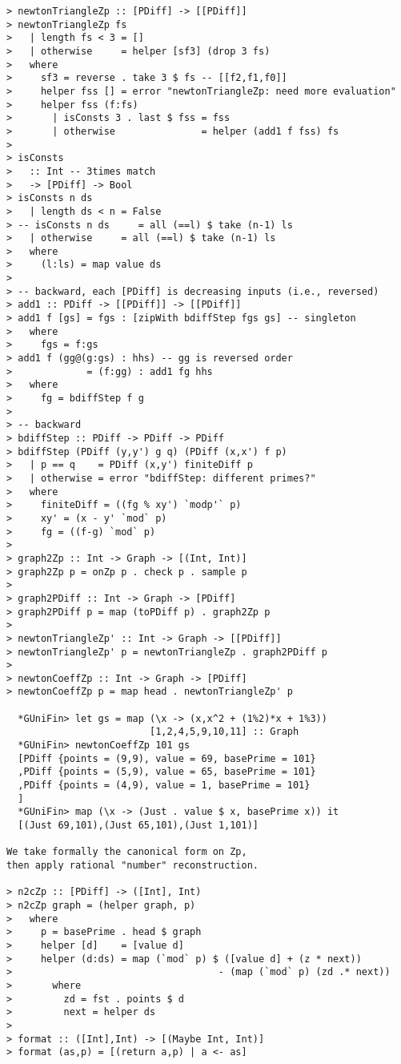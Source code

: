 \documentclass[11pt]{book}
\begin{document}
\begin{verbatim}
> newtonTriangleZp :: [PDiff] -> [[PDiff]]
> newtonTriangleZp fs
>   | length fs < 3 = []
>   | otherwise     = helper [sf3] (drop 3 fs)
>   where
>     sf3 = reverse . take 3 $ fs -- [[f2,f1,f0]]
>     helper fss [] = error "newtonTriangleZp: need more evaluation" 
>     helper fss (f:fs)
>       | isConsts 3 . last $ fss = fss
>       | otherwise               = helper (add1 f fss) fs
>
> isConsts 
>   :: Int -- 3times match
>   -> [PDiff] -> Bool
> isConsts n ds
>   | length ds < n = False    
> -- isConsts n ds     = all (==l) $ take (n-1) ls
>   | otherwise     = all (==l) $ take (n-1) ls
>   where 
>     (l:ls) = map value ds
>
> -- backward, each [PDiff] is decreasing inputs (i.e., reversed)
> add1 :: PDiff -> [[PDiff]] -> [[PDiff]]
> add1 f [gs] = fgs : [zipWith bdiffStep fgs gs] -- singleton
>   where 
>     fgs = f:gs
> add1 f (gg@(g:gs) : hhs) -- gg is reversed order
>             = (f:gg) : add1 fg hhs
>   where
>     fg = bdiffStep f g
>
> -- backward
> bdiffStep :: PDiff -> PDiff -> PDiff
> bdiffStep (PDiff (y,y') g q) (PDiff (x,x') f p)
>   | p == q    = PDiff (x,y') finiteDiff p
>   | otherwise = error "bdiffStep: different primes?"
>   where
>     finiteDiff = ((fg % xy') `modp'` p)
>     xy' = (x - y' `mod` p)
>     fg = ((f-g) `mod` p) 
>
> graph2Zp :: Int -> Graph -> [(Int, Int)]
> graph2Zp p = onZp p . check p . sample p 
>
> graph2PDiff :: Int -> Graph -> [PDiff]
> graph2PDiff p = map (toPDiff p) . graph2Zp p
>
> newtonTriangleZp' :: Int -> Graph -> [[PDiff]]
> newtonTriangleZp' p = newtonTriangleZp . graph2PDiff p
> 
> newtonCoeffZp :: Int -> Graph -> [PDiff]
> newtonCoeffZp p = map head . newtonTriangleZp' p

  *GUniFin> let gs = map (\x -> (x,x^2 + (1%2)*x + 1%3)) 
                         [1,2,4,5,9,10,11] :: Graph 
  *GUniFin> newtonCoeffZp 101 gs
  [PDiff {points = (9,9), value = 69, basePrime = 101}
  ,PDiff {points = (5,9), value = 65, basePrime = 101}
  ,PDiff {points = (4,9), value = 1, basePrime = 101}
  ]
  *GUniFin> map (\x -> (Just . value $ x, basePrime x)) it
  [(Just 69,101),(Just 65,101),(Just 1,101)]

We take formally the canonical form on Zp, 
then apply rational "number" reconstruction.

> n2cZp :: [PDiff] -> ([Int], Int)
> n2cZp graph = (helper graph, p)
>   where
>     p = basePrime . head $ graph
>     helper [d]    = [value d]
>     helper (d:ds) = map (`mod` p) $ ([value d] + (z * next)) 
>                                    - (map (`mod` p) (zd .* next))
>       where 
>         zd = fst . points $ d
>         next = helper ds
>
> format :: ([Int],Int) -> [(Maybe Int, Int)]
> format (as,p) = [(return a,p) | a <- as]
  

\end{verbatim}
\end{document}
